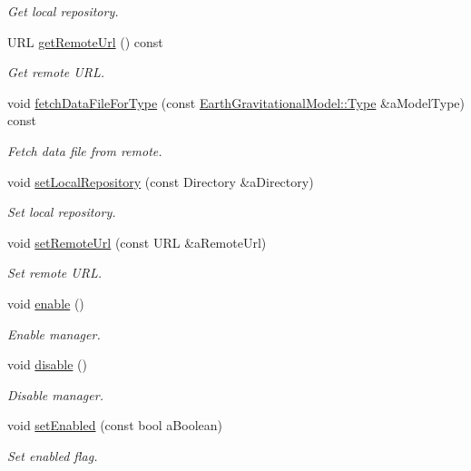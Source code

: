 \begin{DoxyCompactItemize}
\begin{DoxyCompactList}\small\item\em Get local repository. \end{DoxyCompactList}\item 
U\+RL \hyperlink{classlibrary_1_1physics_1_1environment_1_1gravitational_1_1earth_1_1_manager_a2c153ea8718d3090f04b93c897acbc50}{get\+Remote\+Url} () const
\begin{DoxyCompactList}\small\item\em Get remote U\+RL. \end{DoxyCompactList}\item 
void \hyperlink{classlibrary_1_1physics_1_1environment_1_1gravitational_1_1earth_1_1_manager_a780f3766dc88d974424e50866531f6e3}{fetch\+Data\+File\+For\+Type} (const \hyperlink{classlibrary_1_1physics_1_1environment_1_1gravitational_1_1_earth_ab20a2b260831c66ac10f7b9a307d25ca}{Earth\+Gravitational\+Model\+::\+Type} \&a\+Model\+Type) const
\begin{DoxyCompactList}\small\item\em Fetch data file from remote. \end{DoxyCompactList}\item 
void \hyperlink{classlibrary_1_1physics_1_1environment_1_1gravitational_1_1earth_1_1_manager_ac2e9760f5d3efc4cc261153116bed58f}{set\+Local\+Repository} (const Directory \&a\+Directory)
\begin{DoxyCompactList}\small\item\em Set local repository. \end{DoxyCompactList}\item 
void \hyperlink{classlibrary_1_1physics_1_1environment_1_1gravitational_1_1earth_1_1_manager_aa947a0fc00aa98c881a10f904b441cb9}{set\+Remote\+Url} (const U\+RL \&a\+Remote\+Url)
\begin{DoxyCompactList}\small\item\em Set remote U\+RL. \end{DoxyCompactList}\item 
void \hyperlink{classlibrary_1_1physics_1_1environment_1_1gravitational_1_1earth_1_1_manager_aa002b70118ee6a3cb40ef56e50e89b2c}{enable} ()
\begin{DoxyCompactList}\small\item\em Enable manager. \end{DoxyCompactList}\item 
void \hyperlink{classlibrary_1_1physics_1_1environment_1_1gravitational_1_1earth_1_1_manager_ae9182bb337a6dba18bc75f61b7832ef9}{disable} ()
\begin{DoxyCompactList}\small\item\em Disable manager. \end{DoxyCompactList}\item 
void \hyperlink{classlibrary_1_1physics_1_1environment_1_1gravitational_1_1earth_1_1_manager_a64b297b7f838f185e1226dc057d8285f}{set\+Enabled} (const bool a\+Boolean)
\begin{DoxyCompactList}\small\item\em Set enabled flag. \end{DoxyCompactList}\end{DoxyCompactItemize}
